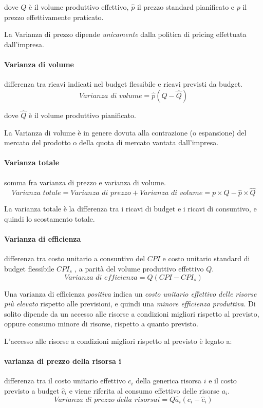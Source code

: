 dove $Q$ \`e il volume produttivo effettivo, $\hat{p}$ il prezzo standard pianificato e $p$ il prezzo effettivamente praticato.

La Varianza di prezzo dipende \emph{unicamente} dalla politica di pricing effettuata dall’impresa.

\paragraph{Varianza di volume} differenza tra ricavi indicati nel budget flessibile e ricavi previsti da budget.
\[
	\textit{Varianza di volume} = \hat{p} \left(Q - \hat{Q}\right)
\]

dove $\hat{Q}$ \`e il volume produttivo pianificato.

La Varianza di volume è in genere dovuta alla contrazione (o espansione) del mercato del prodotto o della quota di mercato vantata dall’impresa.

\paragraph{Varianza totale} somma fra varianza di prezzo e varianza di volume.
\[
	\textit{Varianza totale} = \textit{Varianza di prezzo} + \textit{Varianza di volume} = p \times Q - \hat{p} \times \hat{Q}
\]

La varianza totale è la differenza tra i ricavi di budget e i ricavi di consuntivo, e quindi lo scostamento totale.

\paragraph{Varianza di efficienza} differenza tra costo unitario a consuntivo del $CPI$ e costo
unitario standard di budget flessibile $CPI_s$ , a parità del volume produttivo effettivo $Q$.
\[
	\textit{Varianza di efficienza} = Q \left(CPI - CPI_s\right)
\]

Una varianza di efficienza \emph{positiva} indica un \emph{costo unitario effettivo delle risorse più
elevato} rispetto alle previsioni, e quindi una \emph{minore efficienza produttiva}. Di solito dipende da un accesso alle risorse a
condizioni migliori
rispetto al previsto, oppure consumo minore di
risorse, rispetto a quanto
previsto.

L’accesso alle risorse a condizioni migliori rispetto al previsto è legato a:

\paragraph{varianza di prezzo della risorsa i} differenza tra il costo unitario effettivo $c_i$ della generica risorsa $i$ e il costo previsto a budget $\hat{c}_i$ e viene riferita al consumo effettivo
delle risorse $a_i$.
\[
\textit{Varianza di prezzo della risorsa} i = Q \hat{a}_i \left(c_i - \hat{c}_i\right)
\]

